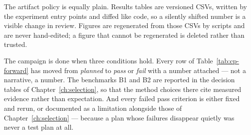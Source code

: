 The artifact policy is equally plain. Results tables are versioned CSVs, written by the experiment entry
points and diffed like code, so a silently shifted number is a visible change in review. Figures are
regenerated from those CSVs by scripts and are never hand-edited; a figure that cannot be regenerated is
deleted rather than trusted.

The campaign is done when three conditions hold. Every row of Table~\ref{tab:cp-forward} has moved from
\emph{planned} to \emph{pass} or \emph{fail} with a number attached --- not a narrative, a number. The
benchmarks B1 and B2 are reported in the decision tables of Chapter~\ref{ch:selection}, so that the
method choices there cite measured evidence rather than expectation. And every failed pass criterion is
either fixed and rerun, or documented as a limitation alongside those of Chapter~\ref{ch:selection} ---
because a plan whose failures disappear quietly was never a test plan at all.
